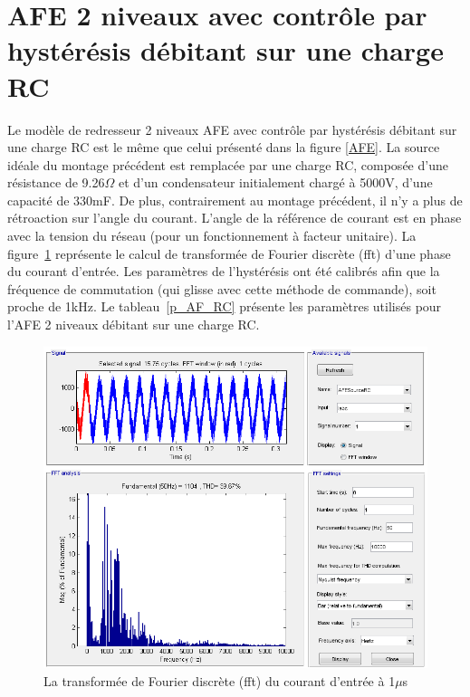 \documentclass[11pt,letterpaper,final]{report}
\begin{document}
\clearpage
\section{AFE 2 niveaux avec contrôle par hystérésis débitant sur une charge RC}
Le modèle de redresseur 2 niveaux AFE avec contrôle par hystérésis débitant sur une charge RC est le même que celui présenté dans la figure \ref{AFE}. La source idéale du montage précédent est remplacée par une charge RC, composée d'une résistance de 9.26$\Omega$ et d'un condensateur initialement chargé à 5000V, d'une capacité de 330mF. De plus, contrairement au montage précédent, il n'y a plus de rétroaction sur l'angle du courant. L'angle de la référence de courant est en phase avec la tension du réseau (pour un fonctionnement à facteur unitaire). La figure~\ref{fft_RC} représente le calcul de transformée de Fourier discrète (fft) d'une phase du courant d'entrée. Les paramètres de l'hystérésis ont été calibrés afin que la fréquence de commutation (qui glisse avec cette méthode de commande), soit proche de 1kHz. Le tableau~\ref{p_AF_RC} présente les paramètres utilisés pour l'AFE 2 niveaux débitant sur une charge RC.

\begin{figure}[htb]
\centering
\includegraphics[scale=0.5]{Fig/AFERC/FFTAnalysisToolResult5u.png}
\caption{La transformée de Fourier discrète (fft) du courant d'entrée à 1$\mu$s}
\label{fft_RC}
\end{figure}
\end{document}

